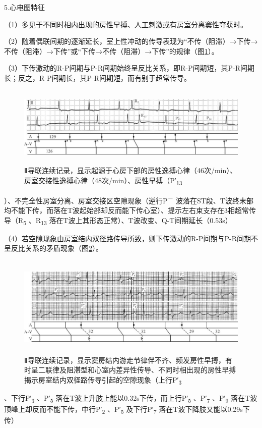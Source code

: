 5.心电图特征

（1）多见于不同时相内出现的房性早搏、人工刺激或有房室分离窦性夺获时。

（2）随着偶联间期的逐渐延长，室上性冲动的传导表现为“不传（阻滞）→下传→不传（阻滞）→下传”或“下传→不传（阻滞）→下传”的规律（图\ref{fig28-10}）。

（3）下传激动的R-P间期与P-R间期始终呈反比关系，即R-P间期短，其P-R间期长；反之，R-P间期长，其P-R间期短，而有别于超常传导。

\begin{figure}[!htbp]
 \centering
 \includegraphics[width=5.86458in,height=1.51042in]{./images/Image00471.jpg}
 \captionsetup{justification=centering}
 \caption{Ⅱ导联连续记录，显示起源于心房下部的房性逸搏心律（46次/min）、房室交接性逸搏心律（48次/min）、房性早搏（P′\textsubscript{13}}
 \label{fig28-10}
  \end{figure} 
）、不完全性房室分离、房室交接区空隙现象（逆行P\textsuperscript{－}
波落在ST段、T波终末部均不能下传，而落在T波起始部却反而能下传心室）、提示左右束支存在3相超常传导（R\textsubscript{5}
、R\textsubscript{13}
落在T波上其形态正常）、T波改变、Q-T间期延长（0.53s）

（4）若空隙现象由房室结内双径路传导所致，则下传激动的R-P间期与P-R间期不呈反比关系的矛盾现象（图\ref{fig28-11}）。

\begin{figure}[!htbp]
 \centering
 \includegraphics[width=5.80208in,height=1.90625in]{./images/Image00472.jpg}
 \captionsetup{justification=centering}
 \caption{Ⅱ导联连续记录，显示窦房结内游走节律伴不齐、频发房性早搏，有时呈二联律及阻滞型和心室内差异性传导、不同时相出现的房性早搏揭示房室结内双径路传导引起的空隙现象（上行P′\textsubscript{3}}
 \label{fig28-11}
  \end{figure} 
、下行P′\textsubscript{3} 、P′\textsubscript{5}
落在T波上升肢上能以0.32s下传，而上行P′\textsubscript{5}
、P′\textsubscript{7} 、P′\textsubscript{9}
落在T波顶峰上却反而不能下传，中行P′\textsubscript{2}
、P′\textsubscript{5} 及下行P′\textsubscript{7}
落在T波下降肢又能以0.29s下传）

